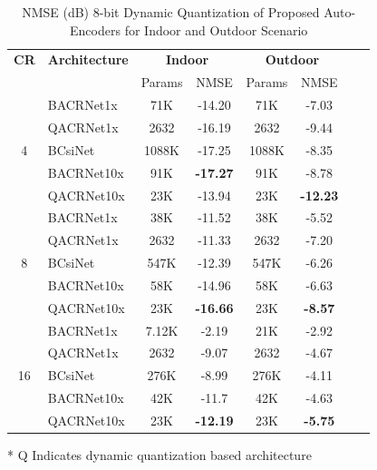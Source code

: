 \documentclass[lettersize,journal]{IEEEtran}
\begin{document}
\begin{table}[ht]
	\centering
	\caption{NMSE (dB) 8-bit Dynamic Quantization of Proposed Auto-Encoders for Indoor and Outdoor Scenario}
	\label{table:dynamicquantization}
	\begin{threeparttable}
		\begin{tabular}{clcccccc}
			\toprule
			\textbf{CR} & \textbf{Architecture} & \multicolumn{2}{c}{\textbf{Indoor}} & \multicolumn{2}{c}{\textbf{Outdoor}} \\ 
			& & Params & NMSE & Params & NMSE \\ 
			\midrule
			\multirow{5}{*}{4} & BACRNet1x\cite{abx} & 71K & -14.20 & 71K & -7.03 \\  
			& QACRNet1x & 2632 & -16.19 & 2632 & -9.44 \\  
			& BCsiNet\cite{abp} & 1088K & -17.25 & 1088K & -8.35 \\ 
			& BACRNet10x\cite{abx} & 91K & \textbf{-17.27} & 91K & -8.78 \\ 
			& QACRNet10x & 23K & -13.94 & 23K & \textbf{-12.23} \\ 
			\midrule
			\multirow{5}{*}{8} & BACRNet1x\cite{abx} & 38K & -11.52 & 38K & -5.52 \\  
			& QACRNet1x & 2632 & -11.33 & 2632 & -7.20 \\  
			& BCsiNet\cite{abp} & 547K & -12.39 & 547K & -6.26 \\ 
			& BACRNet10x\cite{abx} & 58K & -14.96 & 58K & -6.63 \\ 
			& QACRNet10x & 23K & \textbf{-16.66} & 23K & \textbf{-8.57} \\ 
			\midrule
			\multirow{5}{*}{16} & BACRNet1x\cite{abx} & 7.12K & -2.19 & 21K & -2.92 \\  
			& QACRNet1x & 2632 & -9.07 & 2632 & -4.67 \\  
			& BCsiNet\cite{abp} & 276K & -8.99 & 276K & -4.11 \\ 
			& BACRNet10x\cite{abx} & 42K & -11.7 & 42K & -4.63 \\ 
			& QACRNet10x & 23K & \textbf{-12.19} & 23K & \textbf{-5.75} \\ 
			\bottomrule
			
							
		\end{tabular}
		\begin{tablenotes}
			\item[*] Q Indicates dynamic quantization based architecture 
		\end{tablenotes}
	\end{threeparttable}
\end{table}
\end{document}
